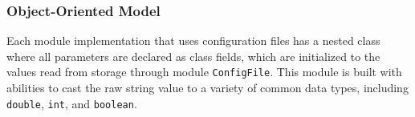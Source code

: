 \documentclass[letterpaper]{article}
\begin{document}
\subsubsection{Object-Oriented Model}
Each module implementation that uses configuration files has a nested class where all parameters are declared as class fields, which are initialized to the values read from storage through module \texttt{ConfigFile}. This module is built with abilities to cast the raw string value to a variety of common data types, including \texttt{double}, \texttt{int}, and \texttt{boolean}.




\end{document}
